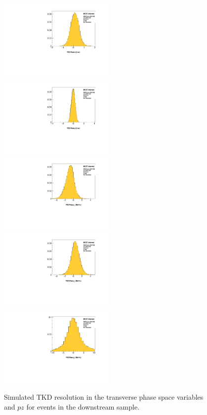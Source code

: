 \begin{figure}[!tbh]
    \includegraphics[width=0.5\textwidth]{03-Detectors/Figures/compare_mc/2017-2.7_6-140_None/tkd_x}
    \includegraphics[width=0.5\textwidth]{03-Detectors/Figures/compare_mc/2017-2.7_6-140_None/tkd_y}
    \includegraphics[width=0.5\textwidth]{03-Detectors/Figures/compare_mc/2017-2.7_6-140_None/tkd_px}
    \includegraphics[width=0.5\textwidth]{03-Detectors/Figures/compare_mc/2017-2.7_6-140_None/tkd_py}
    \includegraphics[width=0.5\textwidth]{03-Detectors/Figures/compare_mc/2017-2.7_6-140_None/tkd_pz}
    \caption{Simulated TKD resolution in the transverse phase space variables and $pz$ for events in the downstream sample. \label{fig:tkd_resolution}}
\end{figure}

